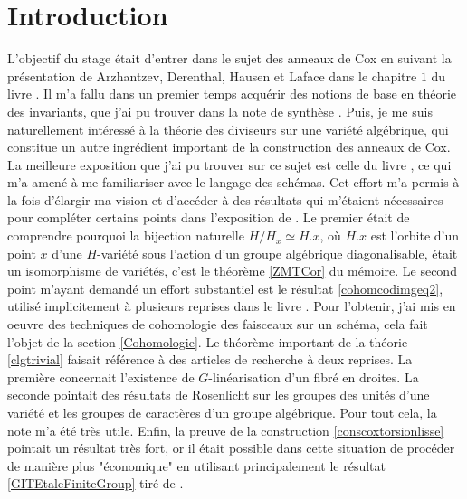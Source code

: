 
\section*{Introduction}

L'objectif du stage était d'entrer dans le sujet des anneaux de Cox en suivant la présentation de Arzhantzev, Derenthal, Hausen et Laface dans le chapitre $1$ du livre \cite{coxrings}. Il m'a fallu dans un premier temps acquérir des notions de base en théorie des invariants, que j'ai pu trouver dans la note de synthèse \cite{LAGBrion}. Puis, je me suis naturellement intéressé à la théorie des diviseurs sur une variété algébrique, qui constitue un autre ingrédient important de la construction des anneaux de Cox. La meilleure exposition que j'ai pu trouver sur ce sujet est celle du livre \cite{Hartshorne}, ce qui m'a amené à me familiariser avec le langage des schémas. Cet effort m'a permis à la fois d'élargir ma vision et d'accéder à des résultats qui m'étaient nécessaires pour compléter certains points dans l'exposition de \cite{coxrings}. Le premier était de comprendre pourquoi la bijection naturelle $H/H_x\simeq H.x$, où $H.x$ est l'orbite d'un point $x$ d'une $H$-variété sous l'action d'un groupe algébrique diagonalisable, était un isomorphisme de variétés, c'est le théorème \ref{ZMTCor} du mémoire. Le second point m'ayant demandé un effort substantiel est le résultat \ref{cohomcodimgeq2}, utilisé implicitement à plusieurs reprises dans le livre \cite{coxrings}. Pour l'obtenir, j'ai mis en oeuvre des techniques de cohomologie des faisceaux sur un schéma, cela fait l'objet de la section \ref{Cohomologie}. Le théorème important de la théorie \ref{clgtrivial} faisait référence à des articles de recherche à deux reprises. La première concernait l'existence de $G$-linéarisation d'un fibré en droites. La seconde pointait des résultats de Rosenlicht sur les groupes des unités d'une variété et les groupes de caractères d'un groupe algébrique. Pour tout cela, la note \cite{LinearizationGBrion} m'a été très utile. Enfin, la preuve de la construction \ref{conscoxtorsionlisse} pointait un résultat très fort, or il était possible dans cette situation de procéder de manière plus "économique" en utilisant principalement le résultat \ref{GITEtaleFiniteGroup} tiré de \cite{MumfordAbelianVarieties}.

